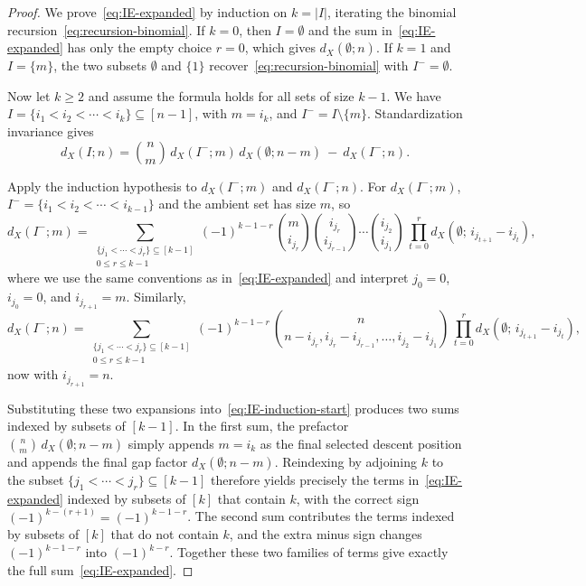 \documentclass[10pt,a4paper]{amsart}
\newcommand{\abs}[1]{\left|#1\right|}
\begin{document}
\begin{proof}
We prove~\eqref{eq:IE-expanded} by induction on \(k=\abs{I}\), iterating the binomial recursion~\eqref{eq:recursion-binomial}.
If \(k=0\), then \(I=\emptyset\) and the sum in~\eqref{eq:IE-expanded} has only the empty choice \(r=0\), which gives
\(d_X(\emptyset;n)\).
If \(k=1\) and \(I=\{m\}\), the two subsets \(\emptyset\) and \(\{1\}\) recover~\eqref{eq:recursion-binomial} with
\(I^-=\emptyset\).

Now let \(k\ge 2\) and assume the formula holds for all sets of size \(k-1\).
We have \(I=\{i_1<i_2<\cdots<i_k\}\subseteq[n-1]\), with \(m=i_k\), and \(I^-=I\setminus\{m\}\).
Standardization invariance gives
\begin{equation}\label{eq:IE-induction-start}
 d_X(I;n)=\binom{n}{m}\,d_X(I^-;m)\,d_X(\emptyset;n-m)\ -\ d_X(I^-;n).
\end{equation}

Apply the induction hypothesis to \(d_X(I^-;m)\) and \(d_X(I^-;n)\).
For \(d_X(I^-;m)\), $I^-=\{i_1<i_2<\cdots<i_{k-1}\}$ and the ambient set has size $m$, so
\[
d_X(I^-;m)
=
\sum_{\substack{\{j_1<\cdots<j_r\}\subseteq [k-1]\\ 0\le r\le k-1}}
(-1)^{k-1-r}\,
\binom{m}{i_{j_r}}\binom{i_{j_r}}{i_{j_{r-1}}}\cdots\binom{i_{j_2}}{i_{j_1}}\,
\prod_{t=0}^{r} d_X(\emptyset;\,i_{j_{t+1}}-i_{j_t}),
\]
where we use the same conventions as in~\eqref{eq:IE-expanded} and interpret \(j_0=0\), \(i_{j_0}=0\), and
\(i_{j_{r+1}}=m\).
Similarly,
\[
d_X(I^-;n)
=
\sum_{\substack{\{j_1<\cdots<j_r\}\subseteq [k-1]\\ 0\le r\le k-1}}
(-1)^{k-1-r}\,
\binom{n}{n-i_{j_r},i_{j_r}-i_{j_{r-1}},\ldots,i_{j_2}-i_{j_1}}\,
\prod_{t=0}^{r} d_X(\emptyset;\,i_{j_{t+1}}-i_{j_t}),
\]
now with \(i_{j_{r+1}}=n\).

Substituting these two expansions into~\eqref{eq:IE-induction-start} produces two sums indexed by subsets of \([k-1]\).
In the first sum, the prefactor \(\binom{n}{m}\,d_X(\emptyset;n-m)\) simply appends \(m=i_k\) as the final selected
descent position and appends the final gap factor \(d_X(\emptyset;n-m)\).  Reindexing by adjoining \(k\) to the subset
\(\{j_1<\cdots<j_r\}\subseteq[k-1]\) therefore yields precisely the terms in~\eqref{eq:IE-expanded} indexed by subsets of
\([k]\) that contain \(k\), with the correct sign \((-1)^{k-(r+1)}=(-1)^{k-1-r}\).
The second sum contributes the terms indexed by subsets of \([k]\) that do not contain \(k\), and the extra minus sign
changes \((-1)^{k-1-r}\) into \((-1)^{k-r}\).
Together these two families of terms give exactly the full sum~\eqref{eq:IE-expanded}.
\end{proof}
\end{document}
